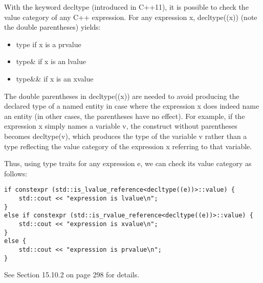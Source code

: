 With the keyword decltype (introduced in C++11), it is possible to check the value category of any C++ expression. For any expression x, decltype((x)) (note the double parentheses) yields:

\begin{itemize}
\item 
type if x is a prvalue

\item
type\& if x is an lvalue

\item
type\&\& if x is an xvalue
\end{itemize}

The double parentheses in decltype((x)) are needed to avoid producing the declared type of a named entity in case where the expression x does indeed name an entity (in other cases, the parentheses have no effect). For example, if the expression x simply names a variable v, the construct without parentheses becomes decltype(v), which produces the type of the variable v rather than a type reflecting the value category of the expression x referring to that variable.

Thus, using type traits for any expression e, we can check its value category as follows:

\begin{lstlisting}[style=styleCXX]
if constexpr (std::is_lvalue_reference<decltype((e))>::value) {
	std::cout << "expression is lvalue\n";
}
else if constexpr (std::is_rvalue_reference<decltype((e))>::value) {
	std::cout << "expression is xvalue\n";
}
else {
	std::cout << "expression is prvalue\n";
}
\end{lstlisting}

See Section 15.10.2 on page 298 for details.







